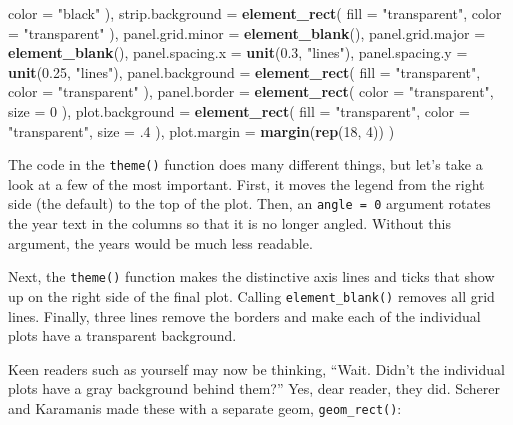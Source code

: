\documentclass[
]{book}
\newenvironment{Shaded}{\begin{snugshade}}{\end{snugshade}}
\newcommand{\AttributeTok}[1]{\textcolor[rgb]{0.13,0.29,0.53}{#1}}
\newcommand{\DecValTok}[1]{\textcolor[rgb]{0.00,0.00,0.81}{#1}}
\newcommand{\FloatTok}[1]{\textcolor[rgb]{0.00,0.00,0.81}{#1}}
\newcommand{\FunctionTok}[1]{\textcolor[rgb]{0.13,0.29,0.53}{\textbf{#1}}}
\newcommand{\NormalTok}[1]{#1}
\newcommand{\StringTok}[1]{\textcolor[rgb]{0.31,0.60,0.02}{#1}}
\begin{document}
\begin{Shaded}
\begin{Highlighting}[]
      \AttributeTok{color =} \StringTok{"black"}
\NormalTok{    ),}
    \AttributeTok{strip.background =} \FunctionTok{element\_rect}\NormalTok{(}
      \AttributeTok{fill =} \StringTok{"transparent"}\NormalTok{,}
      \AttributeTok{color =} \StringTok{"transparent"}
\NormalTok{    ),}
    \AttributeTok{panel.grid.minor =} \FunctionTok{element\_blank}\NormalTok{(),}
    \AttributeTok{panel.grid.major =} \FunctionTok{element\_blank}\NormalTok{(),}
    \AttributeTok{panel.spacing.x =} \FunctionTok{unit}\NormalTok{(}\FloatTok{0.3}\NormalTok{, }\StringTok{"lines"}\NormalTok{),}
    \AttributeTok{panel.spacing.y =} \FunctionTok{unit}\NormalTok{(}\FloatTok{0.25}\NormalTok{, }\StringTok{"lines"}\NormalTok{),}
    \AttributeTok{panel.background =} \FunctionTok{element\_rect}\NormalTok{(}
      \AttributeTok{fill =} \StringTok{"transparent"}\NormalTok{,}
      \AttributeTok{color =} \StringTok{"transparent"}
\NormalTok{    ),}
    \AttributeTok{panel.border =} \FunctionTok{element\_rect}\NormalTok{(}
      \AttributeTok{color =} \StringTok{"transparent"}\NormalTok{,}
      \AttributeTok{size =} \DecValTok{0}
\NormalTok{    ),}
    \AttributeTok{plot.background =} \FunctionTok{element\_rect}\NormalTok{(}
      \AttributeTok{fill =} \StringTok{"transparent"}\NormalTok{,}
      \AttributeTok{color =} \StringTok{"transparent"}\NormalTok{,}
      \AttributeTok{size =}\NormalTok{ .}\DecValTok{4}
\NormalTok{    ),}
    \AttributeTok{plot.margin =} \FunctionTok{margin}\NormalTok{(}\FunctionTok{rep}\NormalTok{(}\DecValTok{18}\NormalTok{, }\DecValTok{4}\NormalTok{))}
\NormalTok{  )}
\end{Highlighting}
\end{Shaded}

The code in the \texttt{theme()} function does many different things, but let's take a look at a few of the most important. First, it moves the legend from the right side (the default) to the top of the plot. Then, an \texttt{angle\ =\ 0} argument rotates the year text in the columns so that it is no longer angled. Without this argument, the years would be much less readable.

Next, the \texttt{theme()} function makes the distinctive axis lines and ticks that show up on the right side of the final plot. Calling \texttt{element\_blank()} removes all grid lines. Finally, three lines remove the borders and make each of the individual plots have a transparent background.

Keen readers such as yourself may now be thinking, ``Wait. Didn't the individual plots have a gray background behind them?'' Yes, dear reader, they did. Scherer and Karamanis made these with a separate geom, \texttt{geom\_rect()}:
\end{document}

